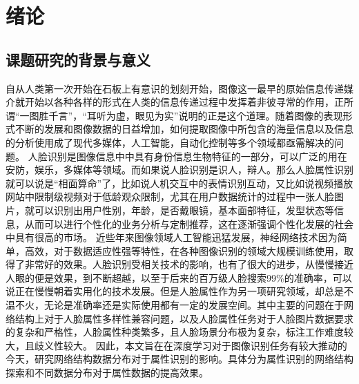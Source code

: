 \chapter{绪论}
\section{课题研究的背景与意义}
自从人类第一次开始在石板上有意识的划刻开始，图像这一最早的原始信息传递媒介就开始以各种各样的形式在人类的信息传递过程中发挥着非彼寻常的作用，正所谓“一图胜千言”，“耳听为虚，眼见为实”说明的正是这个道理。随着图像的表现形式不断的发展和图像数据的日益增加，如何提取图像中所包含的海量信息以及信息的分析使用成了现代多媒体，人工智能，自动化控制等多个领域都亟需解决的问题。
人脸识别是图像信息中中具有身份信息生物特征的一部分，可以广泛的用在安防，娱乐，多媒体等领域。而如果说人脸识别是识人，辩人。那么人脸属性识别就可以说是“相面算命”了，比如说人机交互中的表情识别互动，又比如说视频播放网站中限制级视频对于低龄观众限制，尤其在用户数据统计的过程中一张人脸图片，就可以识别出用户性别，年龄，是否戴眼镜，基本面部特征，发型状态等信息，从而可以进行个性化的业务分析与定制推荐，这在逐渐强调个性化发展的社会中具有很高的市场。
近些年来图像领域人工智能迅猛发展，神经网络技术因为简单，高效，对于数据适应性强等特性，在各种图像识别的领域大规模训练使用，取得了非常好的效果。人脸识别受相关技术的影响，也有了很大的进步，从慢慢接近人眼的便是效果，到不断超越，以至于后来的百万级人脸搜索99\%的准确率，可以说正在慢慢朝着实用化的技术发展。但是人脸属性作为另一项研究领域，却总是不温不火，无论是准确率还是实际使用都有一定的发展空间。其中主要的问题在于网络结构上对于人脸属性多样性兼容问题，以及人脸属性任务对于人脸图片数据要求的复杂和严格性，人脸属性种类繁多，且人脸场景分布极为复杂，标注工作难度较大，且歧义性较大。
因此，本文旨在在深度学习对于图像识别任务有较大推动的今天，研究网络结构数据分布对于属性识别的影响。具体分为属性识别的网络结构探索和不同数据分布对于属性数据的提高效果。
